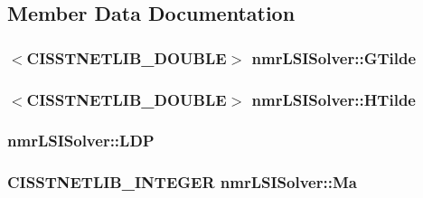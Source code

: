 \subsection{Member Data Documentation}
\hypertarget{classnmr_l_s_i_solver_a984e5149e5c8d0dcb08e06dab7839c27}{
\subsubsection[{G\-Tilde}]{$<$C\-I\-S\-S\-T\-N\-E\-T\-L\-I\-B\-\_\-\-D\-O\-U\-B\-L\-E$>$ nmr\-L\-S\-I\-Solver\-::\-G\-Tilde\hspace{0.3cm}{\ttfamily [protected]}}}\label{classnmr_l_s_i_solver_a984e5149e5c8d0dcb08e06dab7839c27}
\hypertarget{classnmr_l_s_i_solver_a0b156b28be901225f361dcc083070ee7}{
\subsubsection[{H\-Tilde}]{$<$C\-I\-S\-S\-T\-N\-E\-T\-L\-I\-B\-\_\-\-D\-O\-U\-B\-L\-E$>$ nmr\-L\-S\-I\-Solver\-::\-H\-Tilde\hspace{0.3cm}{\ttfamily [protected]}}}\label{classnmr_l_s_i_solver_a0b156b28be901225f361dcc083070ee7}
\hypertarget{classnmr_l_s_i_solver_afe8fa5a7652c9abcb817eaa9c28d0f6a}{
\subsubsection[{L\-D\-P}]{ nmr\-L\-S\-I\-Solver\-::\-L\-D\-P\hspace{0.3cm}{\ttfamily [protected]}}}\label{classnmr_l_s_i_solver_afe8fa5a7652c9abcb817eaa9c28d0f6a}
\hypertarget{classnmr_l_s_i_solver_a7c0ddb46f65e1e8504fba9b247c2b5c6}{
\subsubsection[{Ma}]{\setlength{\rightskip}{0pt plus 5cm}C\-I\-S\-S\-T\-N\-E\-T\-L\-I\-B\-\_\-\-I\-N\-T\-E\-G\-E\-R nmr\-L\-S\-I\-Solver\-::\-Ma\hspace{0.3cm}{\ttfamily [protected]}}}\label{classnmr_l_s_i_solver_a7c0ddb46f65e1e8504fba9b247c2b5c6}
